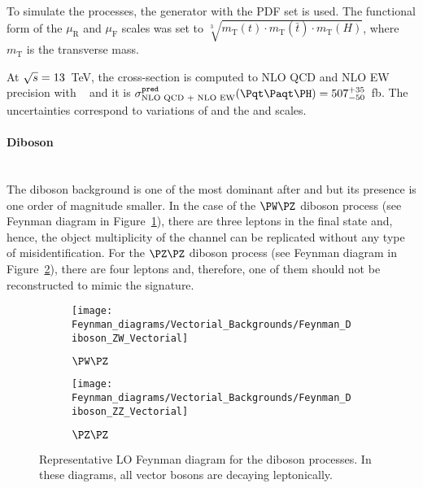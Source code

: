 To simulate the \ttH processes, the \POWHEGBOX[v2] generator with the \NNPDF[3.0nlo] PDF set
is used. The functional form of the $\mu_{\text{R}}$ and $\mu_{\text{F}}$ scales was
set to \(\sqrt[3]{m_\text{T}(t)\cdot m_\text{T}(\bar{t}) \cdot m_\text{T}(H)}\), 
where $m_\text{T}$ is the transverse mass.
 
At $\sqrt{s}=13$~TeV, the cross-section is computed to NLO QCD and 
NLO EW precision with \MGNLO~\cite{LHCHiggsCrossSectionWorkingGroup:2016ypw} and it
is $\sigma_{\text{NLO QCD + NLO EW}}^{\texttt{pred}} (\ttH) = 507^{+35}_{-50}$~fb.
The uncertainties correspond to variations of \alphas and the \muR and \muF scales.
 
\paragraph{Diboson}\mbox{}\\
The diboson background is one of the most dominant after \ttbar and \Zjets
but its presence is one order of magnitude smaller. %
In the case of the $\PW\PZ$ diboson process (see Feynman diagram in
Figure~\ref{fig:tHq:Backgrounds:Feynman_Diboson:WZ}), there
are three leptons in the final state and, hence, the object multiplicity
of the \dileptau channel can be replicated without any type of misidentification.
For the $\PZ\PZ$ diboson process (see Feynman diagram in
Figure~\ref{fig:tHq:Backgrounds:Feynman_Diboson:ZZ}), there
are four leptons and, therefore, one of them should not be reconstructed
to mimic the \dileptau signature.

\begin{figure}[h]
\centering
\begin{subfigure}[b]{0.45\textwidth}
   \texttt{[image: Feynman\_diagrams/Vectorial\_Backgrounds/Feynman\_Diboson\_ZW\_Vectorial]}
   \caption{$\PW \PZ$}
   \label{fig:tHq:Backgrounds:Feynman_Diboson:WZ}
\end{subfigure}
\begin{subfigure}[b]{0.45\textwidth}
   \texttt{[image: Feynman\_diagrams/Vectorial\_Backgrounds/Feynman\_Diboson\_ZZ\_Vectorial]}
   \caption{$\PZ \PZ$}
   \label{fig:tHq:Backgrounds:Feynman_Diboson:ZZ}
\end{subfigure}
\caption{Representative LO Feynman diagram for the diboson processes. 
	In these diagrams, all vector bosons are decaying leptonically.}
\label{fig:tHq:Backgrounds:Feynman_Diboson}
\end{figure}


